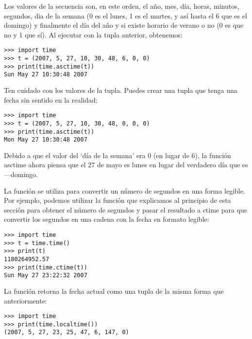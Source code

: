 \noindent

Los valores de la secuencia son, en este orden, el año, mes, día, horas, minutos, segundos, dia de la semana (0 es el lunes, 1 es el martes, y así hasta el 6 que es el domingo) y finalmente el día del año y si existe horario de verano o no (0 es que no y 1 que sí).  Al ejecutar  con la tupla anterior, obtenemos:

\begin{listing}
\begin{verbatim}
>>> import time
>>> t = (2007, 5, 27, 10, 30, 48, 6, 0, 0)
>>> print(time.asctime(t))
Sun May 27 10:30:48 2007
\end{verbatim}
\end{listing}

\noindent
Ten cuidado con los valores de la tupla.   Puedes crear una tupla que tenga una fecha sin sentido en la realidad:

\begin{listing}
\begin{verbatim}
>>> import time
>>> t = (2007, 5, 27, 10, 30, 48, 0, 0, 0)
>>> print(time.asctime(t))
Mon May 27 10:30:48 2007
\end{verbatim}
\end{listing}

\noindent
Debido a que el valor del `día de la semana' era 0 (en lugar de 6), la función asctime ahora piensa que el 27 de mayo es lunes en lugar del verdadero día que es---domingo.

La función  se utiliza para convertir un número de segundos en una forma legible.   Por ejemplo, podemos utilizar la función  que explicamos al principio de esta sección para obtener el número de segundos y pasar el resultado a ctime para que convertir los segundos en una cadena con la fecha en formato legible:

\begin{listingignore}
\begin{verbatim}
>>> import time
>>> t = time.time()
>>> print(t)
1180264952.57
>>> print(time.ctime(t))
Sun May 27 23:22:32 2007
\end{verbatim}
\end{listingignore}

\noindent
La función  retorna la fecha actual como una tupla de la misma forma que anteriormente:

\begin{listingignore}
\begin{verbatim}
>>> import time
>>> print(time.localtime())
(2007, 5, 27, 23, 25, 47, 6, 147, 0)
\end{verbatim}
\end{listingignore}

